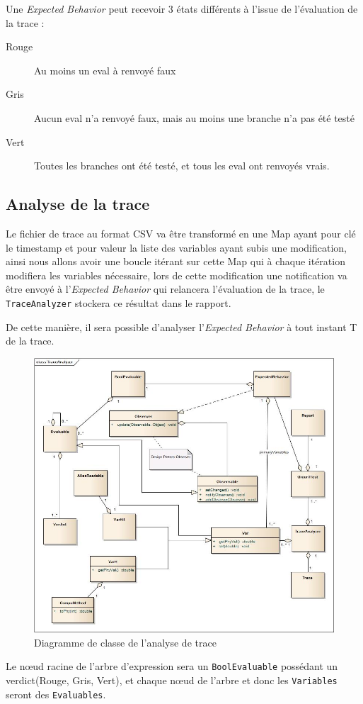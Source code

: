 Une \textit{Expected Behavior} peut recevoir 3 états différents à l'issue de l'évaluation de la trace : 
\begin{description}
	\item[Rouge] Au moins un eval à renvoyé faux
	\item[Gris] Aucun eval n'a renvoyé faux, mais au moins une branche n'a pas été testé
	\item[Vert] Toutes les branches ont été testé, et tous les eval ont renvoyés vrais.
\end{description}

	\subsection{Analyse de la trace}
	Le fichier de trace au format CSV va être transformé en une Map ayant pour clé le timestamp et pour valeur la liste des variables ayant subis une modification, ainsi nous allons avoir une boucle itérant sur cette Map qui à chaque itération modifiera les variables nécessaire, lors de cette modification une notification va être envoyé à l'\textit{Expected Behavior} qui relancera l'évaluation de la trace, le \texttt{TraceAnalyzer} stockera ce résultat dans le rapport. 

	De cette manière, il sera possible d'analyser l'\textit{Expected Behavior} à tout instant T de la trace.
	\vfill~\vfill

 	\begin{figure}[H]
 		\centering
 		\includegraphics[width=17.5cm]{contents/images/TraceAnalyzer.jpg}
 		\caption{Diagramme de classe de l'analyse de trace}
 		\label{fig:diagLogique}
 	\end{figure}
 	Le n\oe{}ud racine de l'arbre d'expression sera un \texttt{BoolEvaluable} possédant un verdict(Rouge, Gris, Vert), et chaque n\oe{}ud de l'arbre et donc les \texttt{Variables} seront des \texttt{Evaluables}.
